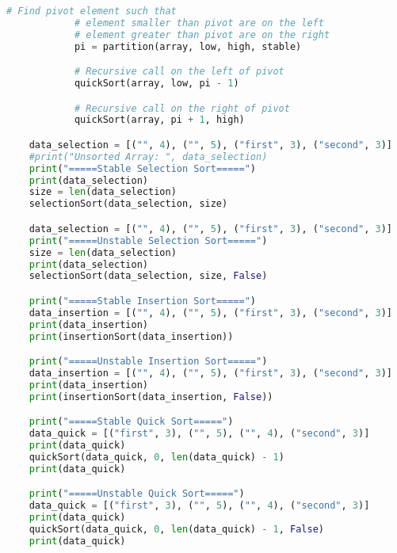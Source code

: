 \documentclass{report}
\begin{document}
\begin{lstlisting}[language=python]
			# Find pivot element such that
			# element smaller than pivot are on the left
			# element greater than pivot are on the right
			pi = partition(array, low, high, stable)

			# Recursive call on the left of pivot
			quickSort(array, low, pi - 1)

			# Recursive call on the right of pivot
			quickSort(array, pi + 1, high)

	data_selection = [("", 4), ("", 5), ("first", 3), ("second", 3)]
	#print("Unsorted Array: ", data_selection)
	print("=====Stable Selection Sort=====")
	print(data_selection)
	size = len(data_selection)
	selectionSort(data_selection, size)

	data_selection = [("", 4), ("", 5), ("first", 3), ("second", 3)]
	print("=====Unstable Selection Sort=====")
	size = len(data_selection)
	print(data_selection)
	selectionSort(data_selection, size, False)

	print("=====Stable Insertion Sort=====")
	data_insertion = [("", 4), ("", 5), ("first", 3), ("second", 3)]
	print(data_insertion)
	print(insertionSort(data_insertion))

	print("=====Unstable Insertion Sort=====")
	data_insertion = [("", 4), ("", 5), ("first", 3), ("second", 3)]
	print(data_insertion)
	print(insertionSort(data_insertion, False))

	print("=====Stable Quick Sort=====")
	data_quick = [("first", 3), ("", 5), ("", 4), ("second", 3)]
	print(data_quick)
	quickSort(data_quick, 0, len(data_quick) - 1)
	print(data_quick)

	print("=====Unstable Quick Sort=====")
	data_quick = [("first", 3), ("", 5), ("", 4), ("second", 3)]
	print(data_quick)
	quickSort(data_quick, 0, len(data_quick) - 1, False)
	print(data_quick)
\end{lstlisting}
\end{document}

